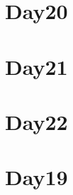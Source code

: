 
\section*{Day20}

\vfill
\section*{Day21}

\vfill
\section*{Day22}

\vfill
\section*{Day19}

\vfill
